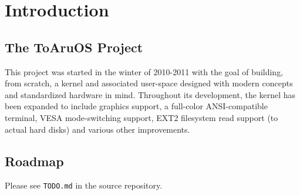 
\section{Introduction}

\subsection{The ToAruOS Project}

This project was started in the winter of 2010-2011 with the goal of building, from scratch, a kernel and associated user-space designed with modern concepts and standardized hardware in mind. Throughout its development, the kernel has been expanded to include graphics support, a full-color ANSI-compatible terminal, VESA mode-switching support, EXT2 filesystem read support (to actual hard disks) and various other improvements.

\subsection{Roadmap}

Please see \texttt{TODO.md} in the source repository.
